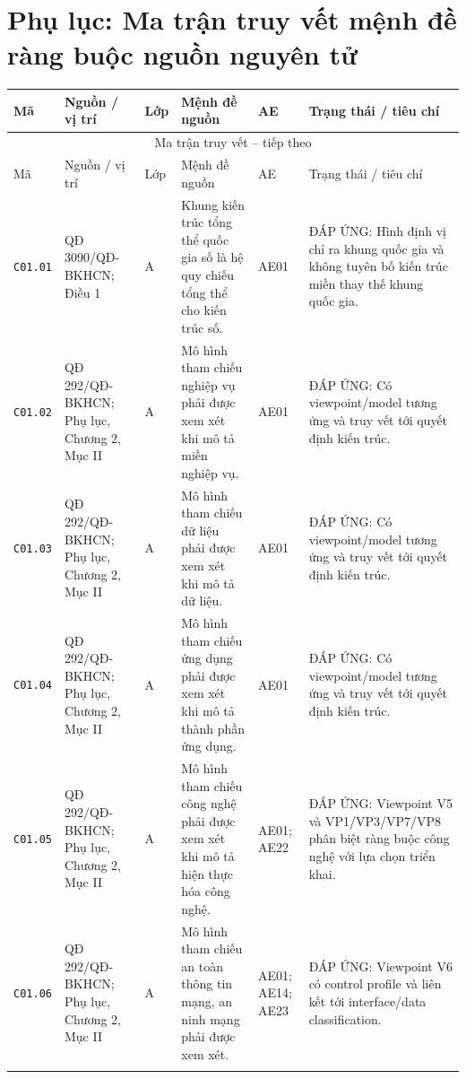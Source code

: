 \section*{Phụ lục: Ma trận truy vết mệnh đề ràng buộc nguồn nguyên tử}
\begingroup\tiny\sloppy\setlength{\emergencystretch}{3em}\renewcommand{\arraystretch}{1.02}
\begin{longtable}{@{}p{0.9cm}p{3.0cm}p{0.55cm}p{4.05cm}p{2.0cm}p{3.45cm}@{}}
\toprule Mã & Nguồn / vị trí & Lớp & Mệnh đề nguồn & AE & Trạng thái / tiêu chí \\ \midrule\endfirsthead
\multicolumn{6}{c}{Ma trận truy vết -- tiếp theo}\\ \toprule Mã & Nguồn / vị trí & Lớp & Mệnh đề nguồn & AE & Trạng thái / tiêu chí \\ \midrule\endhead\bottomrule\endfoot
\texttt{C01.01} & QĐ 3090/QĐ-BKHCN; Điều 1 & A & Khung kiến trúc tổng thể quốc gia số là hệ quy chiếu tổng thể cho kiến trúc số. & AE01 & ĐÁP ỨNG: Hình định vị chỉ ra khung quốc gia và không tuyên bố kiến trúc miền thay thế khung quốc gia. \\ \addlinespace[1pt]
\texttt{C01.02} & QĐ 292/QĐ-BKHCN; Phụ lục, Chương 2, Mục II & A & Mô hình tham chiếu nghiệp vụ phải được xem xét khi mô tả miền nghiệp vụ. & AE01 & ĐÁP ỨNG: Có viewpoint/model tương ứng và truy vết tới quyết định kiến trúc. \\ \addlinespace[1pt]
\texttt{C01.03} & QĐ 292/QĐ-BKHCN; Phụ lục, Chương 2, Mục II & A & Mô hình tham chiếu dữ liệu phải được xem xét khi mô tả dữ liệu. & AE01 & ĐÁP ỨNG: Có viewpoint/model tương ứng và truy vết tới quyết định kiến trúc. \\ \addlinespace[1pt]
\texttt{C01.04} & QĐ 292/QĐ-BKHCN; Phụ lục, Chương 2, Mục II & A & Mô hình tham chiếu ứng dụng phải được xem xét khi mô tả thành phần ứng dụng. & AE01 & ĐÁP ỨNG: Có viewpoint/model tương ứng và truy vết tới quyết định kiến trúc. \\ \addlinespace[1pt]
\texttt{C01.05} & QĐ 292/QĐ-BKHCN; Phụ lục, Chương 2, Mục II & A & Mô hình tham chiếu công nghệ phải được xem xét khi mô tả hiện thực hóa công nghệ. & AE01; AE22 & ĐÁP ỨNG: Viewpoint V5 và VP1/VP3/VP7/VP8 phân biệt ràng buộc công nghệ với lựa chọn triển khai. \\ \addlinespace[1pt]
\texttt{C01.06} & QĐ 292/QĐ-BKHCN; Phụ lục, Chương 2, Mục II & A & Mô hình tham chiếu an toàn thông tin mạng, an ninh mạng phải được xem xét. & AE01; AE14; AE23 & ĐÁP ỨNG: Viewpoint V6 có control profile và liên kết tới interface/data classification. \\ \addlinespace[1pt]

\end{longtable}
